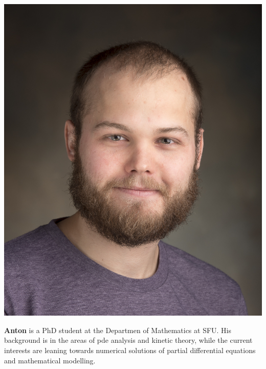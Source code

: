\documentclass{beamer}
\begin{document}
\begin{frame}
\vspace{10pt}
\begin{minipage}[c]{0.15\textwidth}
\includegraphics[width=\textwidth, trim={70pt 170pt 70pt 100pt}, clip]{TeamPics/anton.jpg}
\end{minipage}\hspace{0.05\textwidth}%
\begin{minipage}[c]{0.8\textwidth}
{\small \textbf{Anton} is a PhD student at the Departmen of Mathematics at SFU. His background is in the areas of pde analysis and kinetic theory, while the current interests are leaning towards numerical solutions of partial differential equations and mathematical modelling. }
\end{minipage}

\end{frame}
\end{document}
